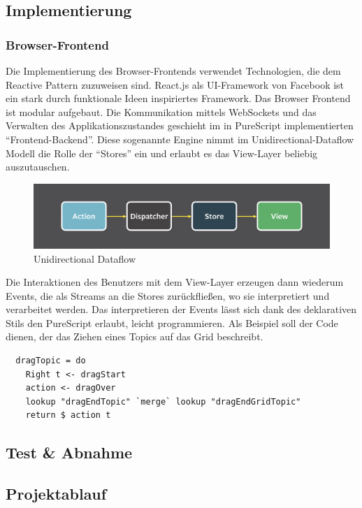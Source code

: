 \subsection{Implementierung}
\subsubsection{Browser-Frontend}
Die Implementierung des Browser-Frontends verwendet Technologien, die dem Reactive Pattern zuzuweisen sind.
React.js als UI-Framework von Facebook ist ein stark durch funktionale Ideen inspiriertes Framework. Das Browser Frontend ist modular aufgebaut. Die Kommunikation mittels WebSockets und das Verwalten des Applikationszustandes geschieht im in PureScript implementierten ``Frontend-Backend''. Diese sogenannte Engine nimmt im Unidirectional-Dataflow Modell die Rolle der ``Stores'' ein und erlaubt es das View-Layer beliebig auszutauschen.
\begin{figure}[h]
\includegraphics[scale=0.3]{img/Unidirectional.png}
\caption{Unidirectional Dataflow}
\end{figure}

Die Interaktionen des Benutzers mit dem View-Layer erzeugen dann wiederum Events, die als Streams an die Stores zurückfließen, wo sie interpretiert und verarbeitet werden. Das interpretieren der Events lässt sich dank des deklarativen Stils den PureScript erlaubt, leicht programmieren. Als Beispiel soll der Code dienen, der das Ziehen eines Topics auf das Grid beschreibt.


\begin{lstlisting}
  dragTopic = do
    Right t <- dragStart
    action <- dragOver
    lookup "dragEndTopic" `merge` lookup "dragEndGridTopic"
    return $ action t
\end{lstlisting}

\subsection{Test \& Abnahme}
\subsection{Projektablauf}
